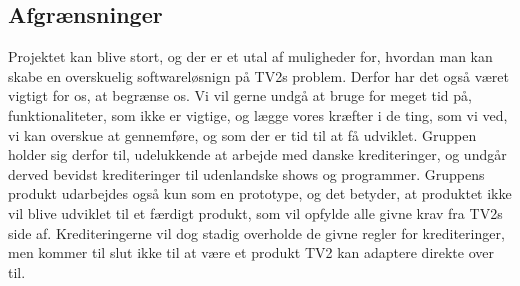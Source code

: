 \subsection{Afgrænsninger}
Projektet kan blive stort, og der er et utal af muligheder for, hvordan man kan skabe en overskuelig softwareløsnign på TV2s problem. Derfor har det også været vigtigt for os, at begrænse os. Vi vil gerne undgå at bruge for meget tid på, funktionaliteter, som ikke er vigtige, og lægge vores kræfter i de ting, som vi ved, vi kan overskue at gennemføre, og som der er tid til at få udviklet. Gruppen holder sig derfor til, udelukkende at arbejde med danske krediteringer, og undgår derved bevidst krediteringer til udenlandske shows og programmer. Gruppens produkt udarbejdes også kun som en prototype, og det betyder, at produktet ikke vil blive udviklet til et færdigt produkt, som vil opfylde alle givne krav fra TV2s side af. Krediteringerne vil dog stadig overholde de givne regler for krediteringer, men kommer til slut ikke til at være et produkt TV2 kan adaptere direkte over til. 
